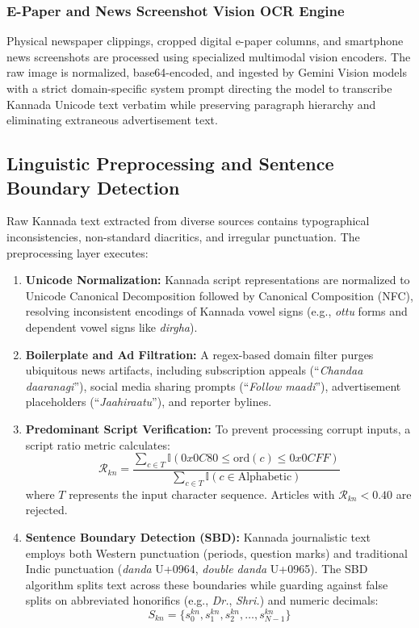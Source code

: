 \documentclass[conference]{IEEEtran}
\begin{document}
\subsubsection{E-Paper and News Screenshot Vision OCR Engine}
Physical newspaper clippings, cropped digital e-paper columns, and smartphone news screenshots are processed using specialized multimodal vision encoders. The raw image is normalized, base64-encoded, and ingested by Gemini Vision models with a strict domain-specific system prompt directing the model to transcribe Kannada Unicode text verbatim while preserving paragraph hierarchy and eliminating extraneous advertisement text.

\subsection{Linguistic Preprocessing and Sentence Boundary Detection}
Raw Kannada text extracted from diverse sources contains typographical inconsistencies, non-standard diacritics, and irregular punctuation. The preprocessing layer executes:
\begin{enumerate}
    \item \textbf{Unicode Normalization:} Kannada script representations are normalized to Unicode Canonical Decomposition followed by Canonical Composition (NFC), resolving inconsistent encodings of Kannada vowel signs (e.g., \textit{ottu} forms and dependent vowel signs like \textit{dirgha}).
    \item \textbf{Boilerplate and Ad Filtration:} A regex-based domain filter purges ubiquitous news artifacts, including subscription appeals (``\textit{Chandaa daaranagi}''), social media sharing prompts (``\textit{Follow maadi}''), advertisement placeholders (``\textit{Jaahiraatu}''), and reporter bylines.
    \item \textbf{Predominant Script Verification:} To prevent processing corrupt inputs, a script ratio metric calculates:
    \begin{equation}
        \mathcal{R}_{kn} = \frac{\sum_{c \in T} \mathbb{I}(0x0C80 \le \text{ord}(c) \le 0x0CFF)}{\sum_{c \in T} \mathbb{I}(c \in \text{Alphabetic})}
        \label{eq:script_ratio}
    \end{equation}
    where $T$ represents the input character sequence. Articles with $\mathcal{R}_{kn} < 0.40$ are rejected.
    \item \textbf{Sentence Boundary Detection (SBD):} Kannada journalistic text employs both Western punctuation (periods, question marks) and traditional Indic punctuation (\textit{danda} U+0964, \textit{double danda} U+0965). The SBD algorithm splits text across these boundaries while guarding against false splits on abbreviated honorifics (e.g., \textit{Dr.}, \textit{Shri.}) and numeric decimals:
    \begin{equation}
        S_{kn} = \{s_0^{kn}, s_1^{kn}, s_2^{kn}, \dots, s_{N-1}^{kn}\}
        \label{eq:sentence_set}
    \end{equation}
\end{enumerate}
\end{document}
